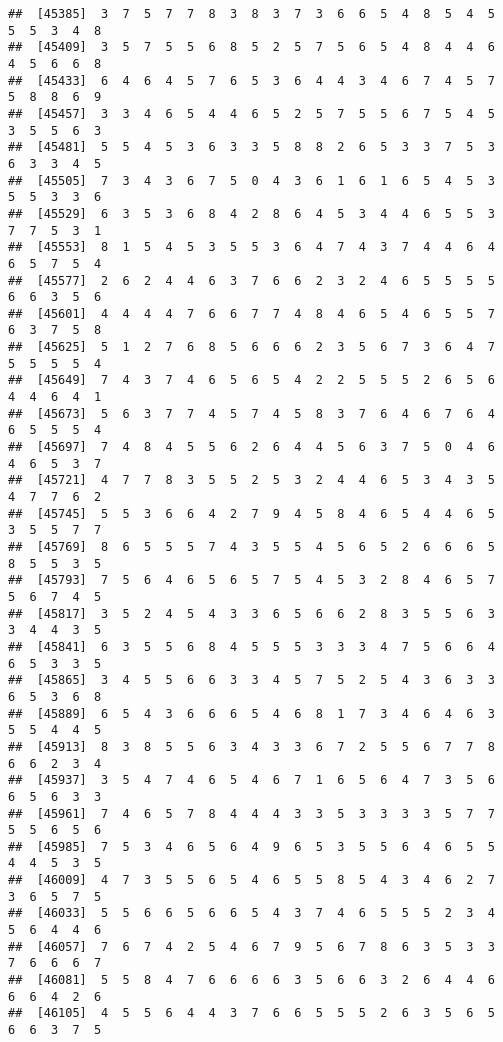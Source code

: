\documentclass[
]{book}
\begin{document}
\begin{verbatim}
##  [45385]  3  7  5  7  7  8  3  8  3  7  3  6  6  5  4  8  5  4  5  5  5  3  4  8
##  [45409]  3  5  7  5  5  6  8  5  2  5  7  5  6  5  4  8  4  4  6  4  5  6  6  8
##  [45433]  6  4  6  4  5  7  6  5  3  6  4  4  3  4  6  7  4  5  7  5  8  8  6  9
##  [45457]  3  3  4  6  5  4  4  6  5  2  5  7  5  5  6  7  5  4  5  3  5  5  6  3
##  [45481]  5  5  4  5  3  6  3  3  5  8  8  2  6  5  3  3  7  5  3  6  3  3  4  5
##  [45505]  7  3  4  3  6  7  5  0  4  3  6  1  6  1  6  5  4  5  3  5  5  3  3  6
##  [45529]  6  3  5  3  6  8  4  2  8  6  4  5  3  4  4  6  5  5  3  7  7  5  3  1
##  [45553]  8  1  5  4  5  3  5  5  3  6  4  7  4  3  7  4  4  6  4  6  5  7  5  4
##  [45577]  2  6  2  4  4  6  3  7  6  6  2  3  2  4  6  5  5  5  5  6  6  3  5  6
##  [45601]  4  4  4  4  7  6  6  7  7  4  8  4  6  5  4  6  5  5  7  6  3  7  5  8
##  [45625]  5  1  2  7  6  8  5  6  6  6  2  3  5  6  7  3  6  4  7  5  5  5  5  4
##  [45649]  7  4  3  7  4  6  5  6  5  4  2  2  5  5  5  2  6  5  6  4  4  6  4  1
##  [45673]  5  6  3  7  7  4  5  7  4  5  8  3  7  6  4  6  7  6  4  6  5  5  5  4
##  [45697]  7  4  8  4  5  5  6  2  6  4  4  5  6  3  7  5  0  4  6  4  6  5  3  7
##  [45721]  4  7  7  8  3  5  5  2  5  3  2  4  4  6  5  3  4  3  5  4  7  7  6  2
##  [45745]  5  5  3  6  6  4  2  7  9  4  5  8  4  6  5  4  4  6  5  3  5  5  7  7
##  [45769]  8  6  5  5  5  7  4  3  5  5  4  5  6  5  2  6  6  6  5  8  5  5  3  5
##  [45793]  7  5  6  4  6  5  6  5  7  5  4  5  3  2  8  4  6  5  7  5  6  7  4  5
##  [45817]  3  5  2  4  5  4  3  3  6  5  6  6  2  8  3  5  5  6  3  3  4  4  3  5
##  [45841]  6  3  5  5  6  8  4  5  5  5  3  3  3  4  7  5  6  6  4  6  5  3  3  5
##  [45865]  3  4  5  5  6  6  3  3  4  5  7  5  2  5  4  3  6  3  3  6  5  3  6  8
##  [45889]  6  5  4  3  6  6  6  5  4  6  8  1  7  3  4  6  4  6  3  5  5  4  4  5
##  [45913]  8  3  8  5  5  6  3  4  3  3  6  7  2  5  5  6  7  7  8  6  6  2  3  4
##  [45937]  3  5  4  7  4  6  5  4  6  7  1  6  5  6  4  7  3  5  6  6  5  6  3  3
##  [45961]  7  4  6  5  7  8  4  4  4  3  3  5  3  3  3  3  5  7  7  5  5  6  5  6
##  [45985]  7  5  3  4  6  5  6  4  9  6  5  3  5  5  6  4  6  5  5  4  4  5  3  5
##  [46009]  4  7  3  5  5  6  5  4  6  5  5  8  5  4  3  4  6  2  7  3  6  5  7  5
##  [46033]  5  5  6  6  5  6  6  5  4  3  7  4  6  5  5  5  2  3  4  5  6  4  4  6
##  [46057]  7  6  7  4  2  5  4  6  7  9  5  6  7  8  6  3  5  3  3  7  6  6  6  7
##  [46081]  5  5  8  4  7  6  6  6  6  3  5  6  6  3  2  6  4  4  6  6  6  4  2  6
##  [46105]  4  5  5  6  4  4  3  7  6  6  5  5  5  2  6  3  5  6  5  6  6  3  7  5

\end{verbatim}
\end{document}
